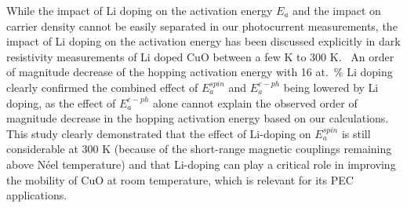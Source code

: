 While the impact of Li doping on the activation energy $E_a$ and the impact on carrier density cannot be easily separated in our photocurrent measurements, the impact of Li doping on the activation energy has been discussed explicitly in dark resistivity measurements of Li doped CuO between a few K to 300 K.~\cite{zheng2004fast,gao2007ferromagnetic} An order of magnitude decrease of the hopping activation energy with 16 at.\ \% Li doping clearly confirmed the combined effect of $E_a^{spin}$ and $E_a^{e-ph}$ being lowered by Li doping, as the effect of $E_a^{e-ph}$ alone cannot explain the observed order of magnitude decrease in the hopping activation energy based on our calculations.~\cite{zheng2004fast} This study clearly demonstrated that the effect of Li-doping on $E_a^{spin}$ is still considerable at 300 K (because of the short-range magnetic couplings remaining above N\'eel temperature)\cite{zheng2001evidence,yang1989magnetic} and that Li-doping can play a critical role in improving the mobility of CuO at room temperature, which is relevant for its PEC applications.


